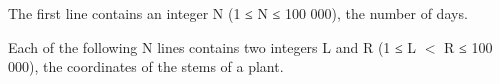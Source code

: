 The first line contains an integer N (1 ≤ N ≤ 100 000), the number of days.  

   Each of the following N lines contains two integers L and R (1 ≤ L $<$ R ≤ 100 000), the coordinates of the stems of a plant.